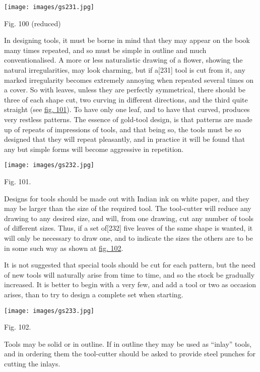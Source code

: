 \documentclass[
]{article}
\begin{document}
\protect\hypertarget{Fig_100}{}{}
\texttt{[image: images/gs231.jpg]}

Fig. 100 (reduced)

In designing tools, it must be borne in mind that they may appear on the
book many times repeated, and so must be simple in outline and much
conventionalised. A more or less naturalistic drawing of a flower,
showing the natural irregularities, may look charming, but if
a{\protect\hypertarget{Page_231}{}{{[}231{]}}} tool is cut from it, any
marked irregularity becomes extremely annoying when repeated several
times on a cover. So with leaves, unless they are perfectly symmetrical,
there should be three of each shape cut, two curving in different
directions, and the third quite straight (see
\protect\hyperlink{Fig_101}{fig. 101}). To have only one leaf, and to
have that curved, produces very restless patterns. The essence of
gold-tool design, is that patterns are made up of repeats of impressions
of tools, and that being so, the tools must be so designed that they
will repeat pleasantly, and in practice it will be found that any but
simple forms will become aggressive in repetition.

\protect\hypertarget{Fig_101}{}{}
\texttt{[image: images/gs232.jpg]}

Fig. 101.

Designs for tools should be made out with Indian ink on white paper, and
they may be larger than the size of the required tool. The tool-cutter
will reduce any drawing to any desired size, and will, from one drawing,
cut any number of tools of different sizes. Thus, if a set
of{\protect\hypertarget{Page_232}{}{{[}232{]}}} five leaves of the same
shape is wanted, it will only be necessary to draw one, and to indicate
the sizes the others are to be in some such way as shown at
\protect\hyperlink{Fig_102}{fig. 102}.

It is not suggested that special tools should be cut for each pattern,
but the need of new tools will naturally arise from time to time, and so
the stock be gradually increased. It is better to begin with a very few,
and add a tool or two as occasion arises, than to try to design a
complete set when starting.

\protect\hypertarget{Fig_102}{}{}
\texttt{[image: images/gs233.jpg]}

Fig. 102.

Tools may be solid or in outline. If in outline they may be used as
``inlay'' tools, and in ordering them the tool-cutter should be asked to
provide steel punches for cutting the inlays.
\end{document}
